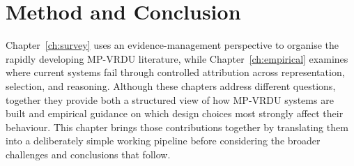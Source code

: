 \documentclass[11pt,twoside,openany]{report}
\begin{document}







\chapter{Method and Conclusion}
\label{ch:conclusion}

Chapter~\ref{ch:survey} uses an evidence-management perspective to organise the rapidly developing MP-VRDU literature, while Chapter~\ref{ch:empirical} examines where current systems fail through controlled attribution across representation, selection, and reasoning. Although these chapters address different questions, together they provide both a structured view of how MP-VRDU systems are built and empirical guidance on which design choices most strongly affect their behaviour. This chapter brings those contributions together by translating them into a deliberately simple working pipeline before considering the broader challenges and conclusions that follow.
\end{document}
